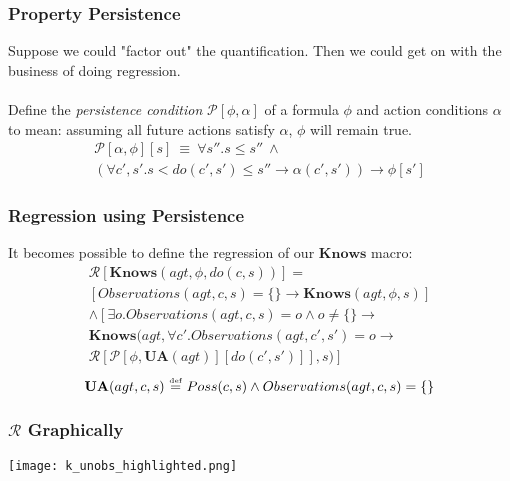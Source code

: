 \documentclass{beamer}
\newcommand{\isdef}{\hbox{$\stackrel{\mbox{\tiny def}}{=}$}}
\begin{document}
\begin{frame}
\frametitle{Property Persistence}
Suppose we could "factor out" the quantification. Then we could get
on with the business of doing regression. 
\ \\
\ \\
Define the \emph{persistence condition} $\mathcal{P}[\phi,\alpha]$ of a formula
 $\phi$ and action conditions $\alpha$ to mean: assuming all future actions
satisfy $\alpha$, $\phi$ will remain true.
\begin{multline*}
  \mathcal{P}[\alpha,\phi][s]\ \equiv\ \forall s''.s \leq s'' \ \wedge\\
    \left( \forall c',s' . s<do(c',s')\leq s'' \rightarrow \alpha (c',s') \right) \rightarrow \phi[s']
\end{multline*}
\end{frame}

\begin{frame}
\frametitle{Regression using Persistence}
It becomes possible to define the regression of our $\mathbf{Knows}$ macro:
\begin{multline*}
  \mathcal{R}[\mathbf{Knows}(agt,\phi,do(c,s))] = \\
     \left[ Observations(agt,c,s) = \{\} \rightarrow \mathbf{Knows}(agt,\phi,s) \right] \\
     \wedge \left[ \exists o . Observations(agt,c,s) = o \wedge o\neq \{\} \rightarrow \right. \\
     \mathbf{Knows}(agt,\forall c' . Observations(agt,c',s')=o \rightarrow \\
     \left.\mathcal{R}[\mathcal{P}[\phi,\mathbf{UA}(agt)][do(c',s')]],s)\right]
\end{multline*}
\begin{equation*}
  \mathbf{UA}(agt,c,s)\ \isdef\ Poss(c,s) \wedge Observations(agt,c,s) = \{\}
\end{equation*}
\end{frame}

\begin{frame}
\frametitle{$\mathcal{R}$ Graphically}
\begin{center}
  \texttt{[image: k\_unobs\_highlighted.png]}
\end{center}
\end{frame}
\end{document}
